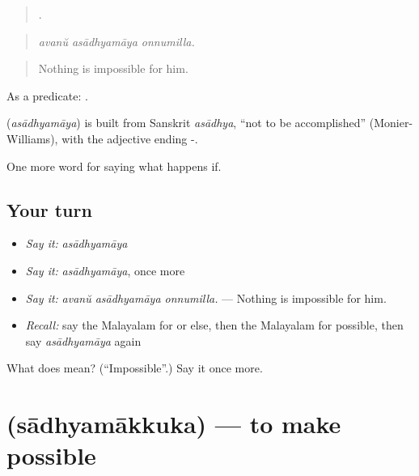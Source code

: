 \begin{quote}
  .
\end{quote}

\begin{quote}
\emph{avanŭ asādhyamāya onnumilla.}
\end{quote}

\begin{quote}
Nothing is impossible for him.
\end{quote}

As a predicate:  .

\begin{cousinweb}
\textbf{} (\emph{asādhyamāya}) is built from Sanskrit \emph{asādhya}, \textquotedblleft{}not to be accomplished\textquotedblright{} (Monier-Williams), with the adjective ending -.
\end{cousinweb}

\begin{grammarlens}[title={What you've built}]
One more word for saying what happens if.
\end{grammarlens}

\subsection*{Your turn}
\begin{itemize}
\raggedright
  \item \emph{Say it:} \emph{asādhyamāya}
  \item \emph{Say it:} \emph{asādhyamāya}, once more
  \item \emph{Say it:} \emph{avanŭ asādhyamāya onnumilla.} — Nothing is impossible for him.
  \item \emph{Recall:} say the Malayalam for or else, then the Malayalam for possible, then say \emph{asādhyamāya} again
\end{itemize}

\begin{tcolorbox}[breakable,colback=teal!4,colframe=teal!35!black,title={Before you move on}]
What does  mean? (\textquotedblleft{}Impossible\textquotedblright{}.) Say it once more.
\end{tcolorbox}
\section[\texorpdfstring{\ml{സാധ്യമാക്കുക} (sādhyamākkuka)}{സാധ്യമാക്കുക (sādhyamākkuka)}]{ (sādhyamākkuka) — to make possible}

